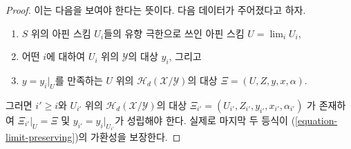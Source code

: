 \begin{proof}
이는 다음을 보여야 한다는 뜻이다. 다음 데이터가 주어졌다고 하자.
\begin{enumerate}
\item $S$ 위의 아핀 스킴 $U_i$들의 유향 극한으로 쓰인 아핀 스킴
$U = \lim_i U_i$,
\item 어떤 $i$에 대하여 $U_i$ 위의 $\mathcal{Y}$의 대상 $y_i$, 그리고
\item $y = y_i|_U$를 만족하는 $U$ 위의
$\mathcal{H}_d(\mathcal{X}/\mathcal{Y})$의 대상
$\Xi = (U, Z, y, x, \alpha)$.
\end{enumerate}
그러면 $i' \geq i$와 $U_{i'}$ 위의
$\mathcal{H}_d(\mathcal{X}/\mathcal{Y})$의 대상
$\Xi_{i'} = (U_{i'}, Z_{i'}, y_{i'}, x_{i'}, \alpha_{i'})$
가 존재하여 $\Xi_{i'}|_U = \Xi$ 및
$y_{i'} = y_i|_{U_{i'}}$가 성립해야 한다. 실제로 마지막 두 등식이
(\ref{equation-limit-preserving})의 가환성을 보장한다.


\end{proof}

